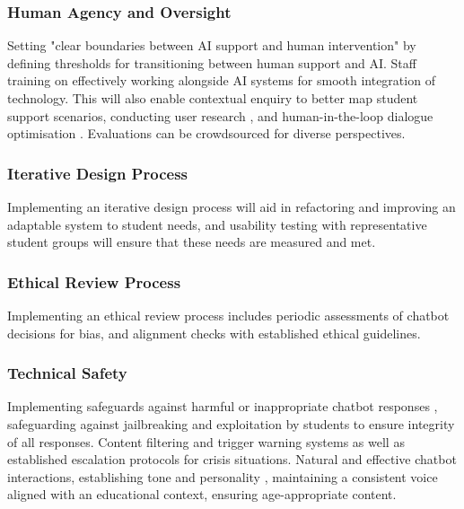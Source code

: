 \documentclass[14pt,a4paper]{article}
\begin{document}
\begin{multicols}{2}
\subsubsection{Human Agency and Oversight}

Setting "clear boundaries between AI support and human intervention" \textit{\parencite{APA2024}}by defining thresholds for transitioning between human support and AI. Staff training on effectively working alongside AI systems for smooth integration of technology. This will also enable contextual enquiry to better map student support scenarios, conducting user research \textit{\parencite[pp. 50-100]{Goodman2023}}, and human-in-the-loop dialogue optimisation \textit{\parencite[pp. 30-60]{Vaughan2024}}. Evaluations can be crowdsourced for diverse perspectives.

\subsubsection*{Iterative Design Process}
Implementing an iterative design process \textit{\parencite[pp. 30-60]{HoltzblattBeyer2024}} will aid in refactoring and improving an adaptable system to student needs, and usability testing with representative student groups will ensure that these needs are measured and met.

\subsubsection*{Ethical Review Process}
Implementing an ethical review process \textit{\parencite{FloridiCowls2023}} includes periodic assessments of chatbot decisions for bias, and alignment checks with established ethical guidelines.

\subsubsection{Technical Safety}
Implementing safeguards against harmful or inappropriate chatbot responses \textit{\parencite[p. e11510]{Bickmore2021}}, safeguarding against jailbreaking and exploitation by students to ensure integrity of all responses. Content filtering and trigger warning systems as well as established escalation protocols for crisis situations. Natural and effective chatbot interactions, establishing tone and personality \textit{\parencite[pp. 20-50]{Bradbury2024}}, maintaining a consistent voice aligned with an educational context, ensuring age-appropriate content.


\end{multicols}
\end{document}
